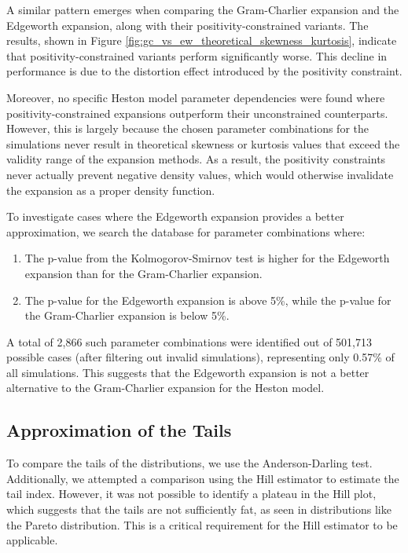 A similar pattern emerges when comparing the Gram-Charlier expansion and the Edgeworth expansion, along with their positivity-constrained variants. The results, shown in Figure \ref{fig:gc_vs_ew_theoretical_skewness_kurtosis}, indicate that positivity-constrained variants perform significantly worse. This decline in performance is due to the distortion effect introduced by the positivity constraint.

Moreover, no specific Heston model parameter dependencies were found where positivity-constrained expansions outperform their unconstrained counterparts. However, this is largely because the chosen parameter combinations for the simulations never result in theoretical skewness or kurtosis values that exceed the validity range of the expansion methods. As a result, the positivity constraints never actually prevent negative density values, which would otherwise invalidate the expansion as a proper density function.

To investigate cases where the Edgeworth expansion provides a better approximation, we search the database for parameter combinations where:
\begin{enumerate}
    \item The p-value from the Kolmogorov-Smirnov test is higher for the Edgeworth expansion than for the Gram-Charlier expansion.
    \item The p-value for the Edgeworth expansion is above 5\%, while the p-value for the Gram-Charlier expansion is below 5\%.
\end{enumerate}
A total of 2,866 such parameter combinations were identified out of 501,713 possible cases (after filtering out invalid simulations), representing only 0.57\% of all simulations. This suggests that the Edgeworth expansion is not a better alternative to the Gram-Charlier expansion for the Heston model.

\subsection{Approximation of the Tails}
To compare the tails of the distributions, we use the Anderson-Darling test. Additionally, we attempted a comparison using the Hill estimator to estimate the tail index. However, it was not possible to identify a plateau in the Hill plot, which suggests that the tails are not sufficiently fat, as seen in distributions like the Pareto distribution. This is a critical requirement for the Hill estimator to be applicable.

